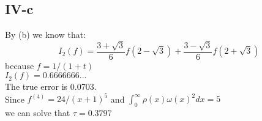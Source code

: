\documentclass[twoside,a4paper]{article}
\begin{document}
\subsection*{IV-c}
By (b) we know that:
$$I_2 (f)=\frac{3+\sqrt{3}}{6}f(2-\sqrt{3})+\frac{3-\sqrt{3}}{6}f(2+\sqrt{3})$$
because $f=1/(1+t)$\\
$I_2(f)=0.6666666...$\\
The true error is 0.0703.\\
Since $f^{(4)}=24/(x + 1)^5$ and $\int_{0}^{\infty} \rho(x) \omega(x) ^2 dx=5$\\
we can solve that $\tau =0.3797$
\end{document}
